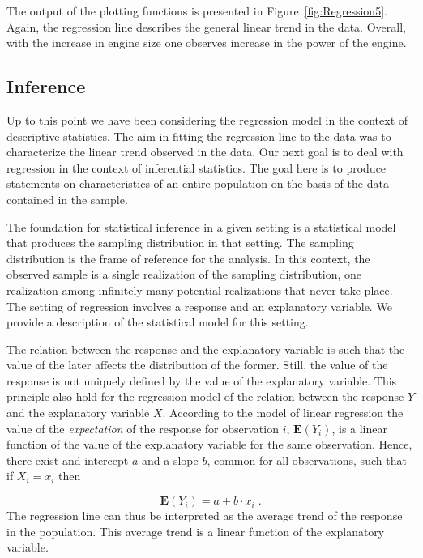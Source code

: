 \documentclass[
]{krantz}
\newcommand{\Expec}{\mathbf{E}}
\theoremstyle{definition}
\theoremstyle{definition}
\theoremstyle{definition}
\theoremstyle{remark}
\begin{document}
The output of the plotting functions is presented in
Figure~\ref{fig:Regression5}. Again, the regression line describes the
general linear trend in the data. Overall, with the increase in engine
size one observes increase in the power of the engine.

\hypertarget{subsec:Inference}{%
\subsection{Inference}\label{subsec:Inference}}

Up to this point we have been considering the regression model in the
context of descriptive statistics. The aim in fitting the regression
line to the data was to characterize the linear trend observed in the
data. Our next goal is to deal with regression in the context of
inferential statistics. The goal here is to produce statements on
characteristics of an entire population on the basis of the data
contained in the sample.

The foundation for statistical inference in a given setting is a
statistical model that produces the sampling distribution in that
setting. The sampling distribution is the frame of reference for the
analysis. In this context, the observed sample is a single realization
of the sampling distribution, one realization among infinitely many
potential realizations that never take place. The setting of regression
involves a response and an explanatory variable. We provide a
description of the statistical model for this setting.

The relation between the response and the explanatory variable is such
that the value of the later affects the distribution of the former.
Still, the value of the response is not uniquely defined by the value of
the explanatory variable. This principle also hold for the regression
model of the relation between the response \(Y\) and the explanatory
variable \(X\). According to the model of linear regression the value of
the \emph{expectation} of the response for observation \(i\), \(\Expec(Y_i)\), is
a linear function of the value of the explanatory variable for the same
observation. Hence, there exist and intercept \(a\) and a slope \(b\),
common for all observations, such that if \(X_i = x_i\) then

\[\Expec(Y_i) = a + b \cdot x_i\;.\] The regression line can thus be
interpreted as the average trend of the response in the population. This
average trend is a linear function of the explanatory variable.
\end{document}
